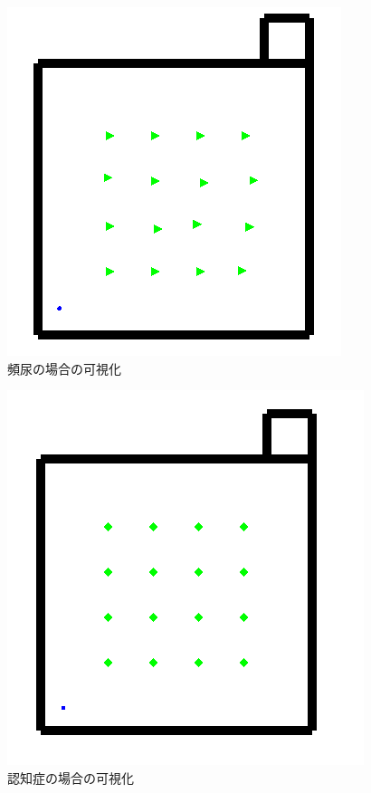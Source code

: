 \begin{figure}[htb]
\begin{center}
 \includegraphics[scale=0.5]{figures/elderly_v2.png}
 \caption[頻尿の場合の可視化]{頻尿の場合の可視化 \label{elderly_v2}}
\end{center}
\end{figure}

\begin{figure}[htb]
\begin{center}
 \includegraphics[scale=0.5]{figures/elderly_v3.png}
 \caption[認知症の場合の可視化]{認知症の場合の可視化 \label{elderly_v3}}
\end{center}
\end{figure}

